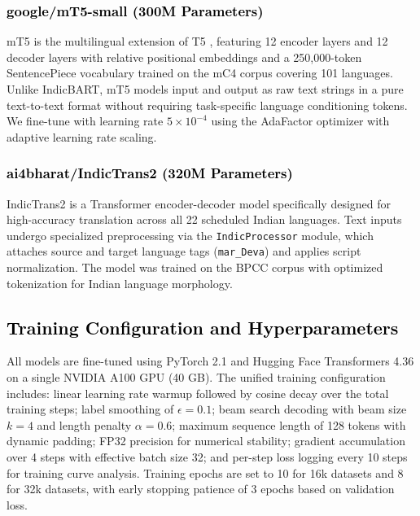 \subsubsection{\textcolor{black}{google/mT5-small (300M Parameters)}}

mT5 \cite{xue2021mt5} is the multilingual extension of T5 \cite{raffel2020exploring}, featuring 12 encoder layers and 12 decoder layers with relative positional embeddings and a 250,000-token SentencePiece vocabulary trained on the mC4 corpus covering 101 languages. Unlike IndicBART, mT5 models input and output as raw text strings in a pure text-to-text format without requiring task-specific language conditioning tokens. We fine-tune with learning rate $5 \times 10^{-4}$ using the AdaFactor optimizer with adaptive learning rate scaling.

\subsubsection{\textcolor{black}{ai4bharat/IndicTrans2 (320M Parameters)}}

IndicTrans2 \cite{gala2023indictrans2} is a Transformer encoder-decoder model specifically designed for high-accuracy translation across all 22 scheduled Indian languages. Text inputs undergo specialized preprocessing via the \texttt{IndicProcessor} module, which attaches source and target language tags (\texttt{mar\_Deva}) and applies script normalization. The model was trained on the BPCC corpus with optimized tokenization for Indian language morphology.

\subsection{\textcolor{black}{Training Configuration and Hyperparameters}}

All models are fine-tuned using PyTorch 2.1 and Hugging Face Transformers 4.36 on a single NVIDIA A100 GPU (40 GB). The unified training configuration includes: linear learning rate warmup followed by cosine decay over the total training steps; label smoothing of $\epsilon = 0.1$; beam search decoding with beam size $k = 4$ and length penalty $\alpha = 0.6$; maximum sequence length of 128 tokens with dynamic padding; FP32 precision for numerical stability; gradient accumulation over 4 steps with effective batch size 32; and per-step loss logging every 10 steps for training curve analysis. Training epochs are set to 10 for 16k datasets and 8 for 32k datasets, with early stopping patience of 3 epochs based on validation loss.

